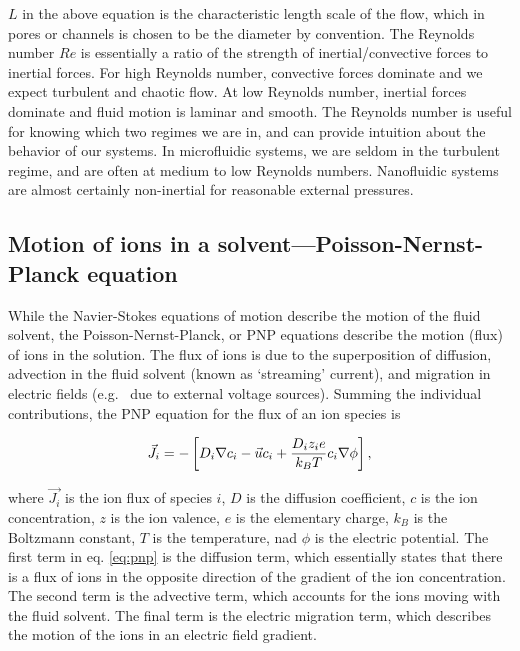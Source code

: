 			$L$ in the above equation is the characteristic length scale of the flow, which in pores or channels is chosen to be the diameter by convention. The Reynolds number $Re$ is essentially a ratio of the strength of inertial/convective forces to inertial forces. For high Reynolds number, convective forces dominate and we expect turbulent and chaotic flow. At low Reynolds number, inertial forces dominate and fluid motion is laminar and smooth. The Reynolds number is useful for knowing which two regimes we are in, and can provide intuition about the behavior of our systems. In microfluidic systems, we are seldom in the turbulent regime, and are often at medium to low Reynolds numbers. Nanofluidic systems are almost certainly non-inertial for reasonable external pressures.
			

			
		\subsection{Motion of ions in a solvent---Poisson-Nernst-Planck equation}
		
			While the Navier-Stokes equations of motion describe the motion of the fluid solvent, the Poisson-Nernst-Planck, or PNP equations describe the motion (flux) of ions in the solution. The flux of ions is due to the superposition of diffusion, advection in the fluid solvent (known as `streaming' current), and migration in electric fields (e.g.~ due to external voltage sources). Summing the individual contributions, the PNP equation for the flux of an ion species is
			
			\begin{equation} \label{eq:pnp}
				\vec{J_{i}}=-\left[D_{i}\mathbf{\nabla}c_{i}-\vec{u}c_{i}+\frac{D_{i}z_{i}e}{k_{B}T}c_{i}\mathbf{\nabla}\phi\right],		
			\end{equation}
	
			where $\vec{J_{i}}$ is the ion flux of species $i$, $D$ is the diffusion coefficient, $c$ is the ion concentration, $z$ is the ion valence, $e$ is the elementary charge, $k_{B}$ is the Boltzmann constant, $T$ is the temperature, nad $\phi$ is the electric potential. The first term in eq. \ref{eq:pnp} is the diffusion term, which essentially states that there is a flux of ions in the opposite direction of the gradient of the ion concentration. The second term is the advective term, which accounts for the ions moving with the fluid solvent. The final term is the electric migration term, which describes the motion of the ions in an electric field gradient. 
			

